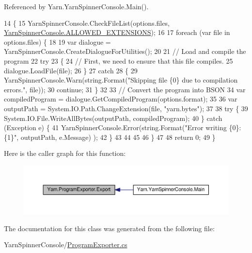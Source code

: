 Referenced by Yarn.\-Yarn\-Spinner\-Console.\-Main().


\begin{DoxyCode}
14         \{
15             YarnSpinnerConsole.CheckFileList(options.files, 
      \hyperlink{a00189_a0979de7ea02c8c0375b8220a12e6575e}{YarnSpinnerConsole.ALLOWED\_EXTENSIONS});
16 
17             \textcolor{keywordflow}{foreach} (var file \textcolor{keywordflow}{in} options.files) \{
18 
19                 var dialogue = YarnSpinnerConsole.CreateDialogueForUtilities();
20 
21                 \textcolor{comment}{// Load and compile the program}
22                 \textcolor{keywordflow}{try}
23                 \{
24                     \textcolor{comment}{// First, we need to ensure that this file compiles.}
25                     dialogue.LoadFile(file);
26                 \}
27                 \textcolor{keywordflow}{catch}
28                 \{
29                     YarnSpinnerConsole.Warn(string.Format(\textcolor{stringliteral}{"Skipping file \{0\} due to compilation errors."}, 
      file));
30                     \textcolor{keywordflow}{continue};
31                 \}
32 
33                 \textcolor{comment}{// Convert the program into BSON}
34                 var compiledProgram = dialogue.GetCompiledProgram(options.format);
35 
36                 var outputPath = System.IO.Path.ChangeExtension(file, \textcolor{stringliteral}{"yarn.bytes"});
37 
38                 \textcolor{keywordflow}{try} \{
39                     System.IO.File.WriteAllBytes(outputPath, compiledProgram);
40                 \} \textcolor{keywordflow}{catch} (Exception e) \{
41                     YarnSpinnerConsole.Error(string.Format(\textcolor{stringliteral}{"Error writing \{0\}: \{1\}"}, outputPath, e.Message)
      );
42                 \}
43 
44 
45 
46             \}
47 
48             \textcolor{keywordflow}{return} 0;
49         \}
\end{DoxyCode}


Here is the caller graph for this function\-:
\nopagebreak
\begin{figure}[H]
\begin{center}
\leavevmode
\includegraphics[width=350pt]{a00147_a3679a1f144471ea411fed34f6a79a18d_icgraph}
\end{center}
\end{figure}




The documentation for this class was generated from the following file\-:\begin{DoxyCompactItemize}
\item 
Yarn\-Spinner\-Console/\hyperlink{a00314}{Program\-Exporter.\-cs}\end{DoxyCompactItemize}
